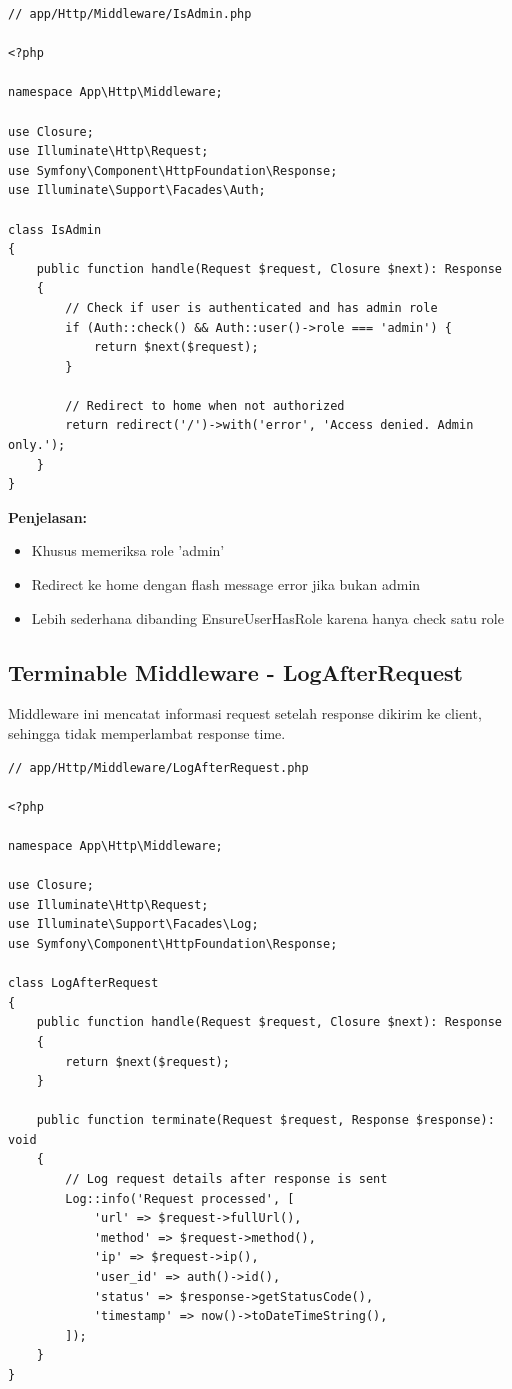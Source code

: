 \documentclass[a4paper,oneside,11pt]{book}
\begin{document}
\begin{lstlisting}[style=phpstyle]
// app/Http/Middleware/IsAdmin.php

<?php

namespace App\Http\Middleware;

use Closure;
use Illuminate\Http\Request;
use Symfony\Component\HttpFoundation\Response;
use Illuminate\Support\Facades\Auth;

class IsAdmin
{
    public function handle(Request $request, Closure $next): Response
    {
        // Check if user is authenticated and has admin role
        if (Auth::check() && Auth::user()->role === 'admin') {
            return $next($request);
        }

        // Redirect to home when not authorized
        return redirect('/')->with('error', 'Access denied. Admin only.');
    }
}
\end{lstlisting}

\textbf{Penjelasan:}
\begin{itemize}
    \item Khusus memeriksa role 'admin'
    \item Redirect ke home dengan flash message error jika bukan admin
    \item Lebih sederhana dibanding EnsureUserHasRole karena hanya check satu role
\end{itemize}

\subsection{Terminable Middleware - LogAfterRequest}
Middleware ini mencatat informasi request setelah response dikirim ke client, sehingga tidak memperlambat response time.

\begin{lstlisting}[style=phpstyle]
// app/Http/Middleware/LogAfterRequest.php

<?php

namespace App\Http\Middleware;

use Closure;
use Illuminate\Http\Request;
use Illuminate\Support\Facades\Log;
use Symfony\Component\HttpFoundation\Response;

class LogAfterRequest
{
    public function handle(Request $request, Closure $next): Response
    {
        return $next($request);
    }

    public function terminate(Request $request, Response $response): void
    {
        // Log request details after response is sent
        Log::info('Request processed', [
            'url' => $request->fullUrl(),
            'method' => $request->method(),
            'ip' => $request->ip(),
            'user_id' => auth()->id(),
            'status' => $response->getStatusCode(),
            'timestamp' => now()->toDateTimeString(),
        ]);
    }
}
\end{lstlisting}
\end{document}
